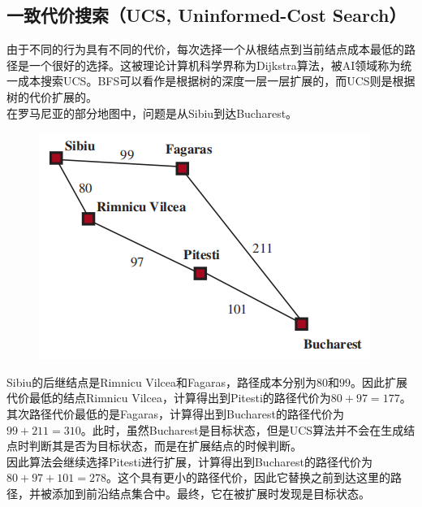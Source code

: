 \subsection{一致代价搜索（UCS, Uninformed-Cost Search）}

由于不同的行为具有不同的代价，每次选择一个从根结点到当前结点成本最低的路径是一个很好的选择。这被理论计算机科学界称为Dijkstra算法，被AI领域称为统一成本搜索UCS。BFS可以看作是根据树的深度一层一层扩展的，而UCS则是根据树的代价扩展的。\\

在罗马尼亚的部分地图中，问题是从Sibiu到达Bucharest。\\

\begin{figure}[H]
    \centering
    \includegraphics{img/C1/1-4/3.png}
\end{figure}

Sibiu的后继结点是Rimnicu Vilcea和Fagaras，路径成本分别为$ 80 $和$ 99 $。因此扩展代价最低的结点Rimnicu Vilcea，计算得出到Pitesti的路径代价为$ 80 + 97 = 177 $。\\

其次路径代价最低的是Fagaras，计算得出到Bucharest的路径代价为$ 99 + 211 = 310 $。此时，虽然Bucharest是目标状态，但是UCS算法并不会在生成结点时判断其是否为目标状态，而是在扩展结点的时候判断。\\

因此算法会继续选择Pitesti进行扩展，计算得出到Bucharest的路径代价为$ 80 + 97 + 101 = 278 $。这个具有更小的路径代价，因此它替换之前到达这里的路径，并被添加到前沿结点集合中。最终，它在被扩展时发现是目标状态。\\

